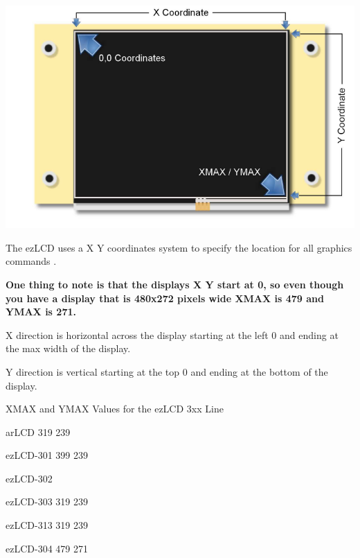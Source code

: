  
\begin{DoxyImageNoCaption}
  \mbox{\includegraphics{ezLCD303-coord}}
\end{DoxyImageNoCaption}
 

The ez\-L\-C\-D uses a X Y coordinates system to specify the location for all graphics commands .\par
 {\bfseries One thing to note is that the displays X Y start at 0, so even though you have a display that is 480x272 pixels wide X\-M\-A\-X is 479 and Y\-M\-A\-X is 271.}\par
 X direction is horizontal across the display starting at the left 0 and ending at the max width of the display.\par
 Y direction is vertical starting at the top 0 and ending at the bottom of the display. \par


X\-M\-A\-X and Y\-M\-A\-X Values for the ez\-L\-C\-D 3xx Line\par
 ar\-L\-C\-D 319 239\par
 ez\-L\-C\-D-\/301 399 239\par
 ez\-L\-C\-D-\/302 \par
 ez\-L\-C\-D-\/303 319 239\par
 ez\-L\-C\-D-\/313 319 239\par
 ez\-L\-C\-D-\/304 479 271\par
